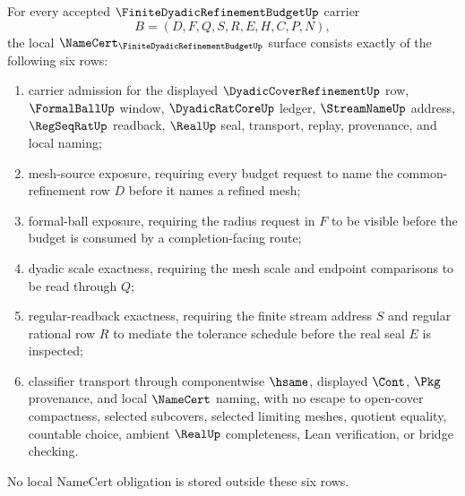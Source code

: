 \begin{theorem}
\label{thm:finite-dyadic-refinement-budget-namecert-obligations}
For every accepted $\FiniteDyadicRefinementBudgetUp$ carrier
$$
B=(D,F,Q,S,R,E,H,C,P,N),
$$
the local $\NameCert_{\FiniteDyadicRefinementBudgetUp}$ surface consists exactly of the following six rows:
\begin{enumerate}
\item carrier admission for the displayed $\DyadicCoverRefinementUp$ row, $\FormalBallUp$ window, $\DyadicRatCoreUp$ ledger, $\StreamNameUp$ address, $\RegSeqRatUp$ readback, $\RealUp$ seal, transport, replay, provenance, and local naming;
\item mesh-source exposure, requiring every budget request to name the common-refinement row $D$ before it names a refined mesh;
\item formal-ball exposure, requiring the radius request in $F$ to be visible before the budget is consumed by a completion-facing route;
\item dyadic scale exactness, requiring the mesh scale and endpoint comparisons to be read through $Q$;
\item regular-readback exactness, requiring the finite stream address $S$ and regular rational row $R$ to mediate the tolerance schedule before the real seal $E$ is inspected;
\item classifier transport through componentwise $\hsame$, displayed $\Cont$, $\Pkg$ provenance, and local $\NameCert$ naming, with no escape to open-cover compactness, selected subcovers, selected limiting meshes, quotient equality, countable choice, ambient $\RealUp$ completeness, Lean verification, or bridge checking.
\end{enumerate}
No local NameCert obligation is stored outside these six rows.
\end{theorem}
